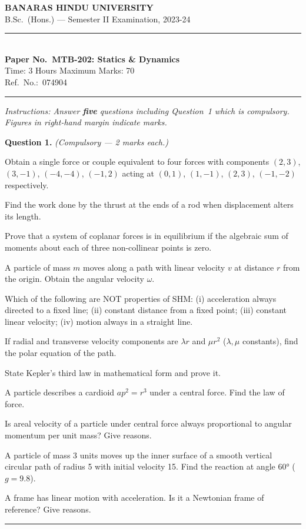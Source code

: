 \documentclass[11pt,a4paper]{article}
\begin{document}
\begin{center}
  {\large\bfseries BANARAS HINDU UNIVERSITY}\\[2pt]
  {\normalsize B.Sc.\ (Hons.) --- Semester II Examination, 2023-24}\\[6pt]
  \rule{0.8\linewidth}{0.5pt}\\[6pt]
  {\large\bfseries Paper No.\ MTB-202: Statics \& Dynamics}\\[4pt]
  {\normalsize Time: 3 Hours \hfill Maximum Marks: 70}\\[2pt]
  {\small Ref.\ No.:\ 074904}
\end{center}
\rule{\linewidth}{0.4pt}
\smallskip



\noindent   \textit{Instructions: Answer   \textbf{five} questions including Question~1 which is compulsory. Figures in right-hand margin indicate marks.}
\bigskip




\noindent   \textbf{Question 1.}   \textit{(Compulsory --- 2 marks each.)}

\begin{parts}
  \item Obtain a single force or couple equivalent to four forces with components $(2,3)$, $(3,-1)$, $(-4,-4)$, $(-1,2)$ acting at $(0,1)$, $(1,-1)$, $(2,3)$, $(-1,-2)$ respectively.
  \item Find the work done by the thrust at the ends of a rod when displacement alters its length.
  \item Prove that a system of coplanar forces is in equilibrium if the algebraic sum of moments about each of three non-collinear points is zero.
  \item A particle of mass $m$ moves along a path with linear velocity $v$ at distance $r$ from the origin. Obtain the angular velocity $\omega$.
  \item Which of the following are NOT properties of SHM: (i) acceleration always directed to a fixed line; (ii) constant distance from a fixed point; (iii) constant linear velocity; (iv) motion always in a straight line.
  \item If radial and transverse velocity components are $\lambda r$ and $\mu r^2$ ($\lambda,\mu$ constants), find the polar equation of the path.
  \item State Kepler's third law in mathematical form and prove it.
  \item A particle describes a cardioid $ap^2=r^3$ under a central force. Find the law of force.
  \item Is areal velocity of a particle under central force always proportional to angular momentum per unit mass? Give reasons.
  \item A particle of mass 3 units moves up the inner surface of a smooth vertical circular path of radius 5 with initial velocity 15. Find the reaction at angle $60°$ ($g=9.8$).
  \item A frame has linear motion with acceleration. Is it a Newtonian frame of reference? Give reasons.
\end{parts}
\medskip\rule{\linewidth}{0.2pt}
\end{document}
